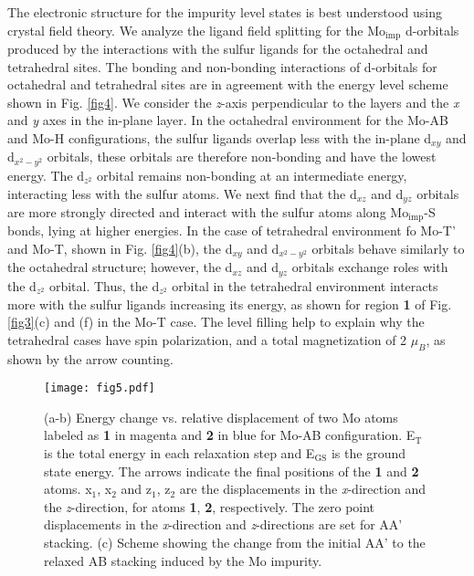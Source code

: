 \documentclass[pra,twocolumn,preprintnumbers,amsmath,amssymb]{revtex4}
\begin{document}
The electronic structure for the impurity level states is best understood  using crystal field theory. We analyze the ligand field splitting for the Mo$_\mathrm{imp}$ d-orbitals produced by the interactions with the sulfur ligands for the octahedral and tetrahedral sites. The bonding and non-bonding
interactions of d-orbitals for octahedral and tetrahedral sites are in agreement with the energy level scheme shown in Fig. \ref{fig4}.
We consider the \textit{z}-axis perpendicular to the layers and the \textit{x} and  \textit{y} axes in the in-plane layer.
In the octahedral environment for the Mo-AB and Mo-H configurations, the sulfur ligands overlap less with the in-plane d$_{xy}$ and
d$_{x^{2}-y^{2}}$ orbitals,  these orbitals are therefore non-bonding and have the lowest energy. The d$_{z^{2}}$ orbital
remains non-bonding at an intermediate energy, interacting less with the sulfur atoms. We next find that the d$_{xz}$ and d$_{yz}$ orbitals are more strongly directed and interact with the sulfur atoms along Mo$_\mathrm{imp}$-S bonds, lying at higher energies.
In the case of tetrahedral environment fo Mo-T' and Mo-T, shown in Fig. \ref{fig4}(b),
the d$_{xy}$ and d$_{x^{2}-y^{2}}$ orbitals behave similarly to the octahedral structure; however, the d$_{xz}$ and d$_{yz}$ orbitals exchange roles with the d$_{z^{2}}$ orbital. Thus, the d$_{z^{2}}$ orbital in the tetrahedral environment interacts more with the sulfur ligands increasing its energy, as shown for region \textbf{1} of Fig. \ref{fig3}(c) and (f) in the Mo-T case.
The level filling help to explain why the tetrahedral cases have spin polarization, and a total magnetization of 2 $\mu_B$, as shown by the arrow counting.


\begin{figure*}[ht]
\centering
\texttt{[image: fig5.pdf]}
\caption{(a-b) Energy change vs. relative displacement of two Mo atoms labeled as \textbf{1} in magenta and \textbf{2} in blue for Mo-AB configuration. E$_\mathrm{{T}}$ is the total energy in each relaxation step and E$_\mathrm{{GS}}$ is the ground state energy. The arrows indicate the final positions of the \textbf{1} and \textbf{2} atoms. x$_{1}$, x$_{2}$ and z$_{1}$, z$_{2}$ are the displacements in the \textit{x}-direction and the \textit{z}-direction, for atoms \textbf{1}, \textbf{2}, respectively. The zero point displacements in the \textit{x}-direction and \textit{z}-directions are set for AA' stacking. (c) Scheme showing the change from the initial AA' to the relaxed AB stacking induced by the Mo impurity.} \label{fig5}
\end{figure*}
\end{document}
